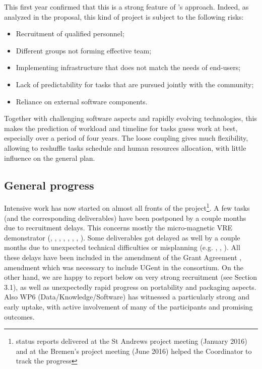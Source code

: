 \documentclass{deliverablereport}
\begin{document}
This first year confirmed that this is a strong feature of \ODK's
approach. Indeed, as analyzed in the proposal, this kind of project is
subject to the following risks:
\begin{itemize}
\item Recruitment of qualified personnel;
\item Different groups not forming effective team;
\item Implementing infrastructure that does not match the needs of end-users;
\item Lack of predictability for tasks that are pursued jointly with
  the community;
\item Reliance on external software components.
\end{itemize}
Together with challenging software aspects and rapidly evolving
technologies, this makes the prediction of workload and timeline for
tasks guess work at best, especially over a period of four years. The
loose coupling gives much flexibility, allowing to reshuffle tasks
schedule and human resources allocation, with little influence on the
general plan.

\subsection{General progress}

Intensive work has now started on almost all fronts of the project\footnote{status reports delivered at the St Andrews project meeting (January 2016) and at the Bremen's project meeting (June 2016) helped the Coordinator to track the progress}. A
few tasks (and the corresponding deliverables) have been postponed by
a couple months due to recruitment delays. This concerns mostly the
micro-magnetic VRE demonstrator (, ,
 , , , ,
 , ). Some deliverables got delayed as well
by a couple months due to unexpected technical difficulties or
misplanning (e.g. ,
, ). All these delays have been included in the amendment of the Grant Agreement
, amendment which was necessary to include UGent in the consortium. On
the other hand, we are happy to report below on very strong
recruitment (see Section 3.1), as well as unexpectedly rapid
progress on portability and packaging aspects. Also WP6
(Data/Knowledge/Software) has witnessed a particularly strong and
early uptake, with active involvement of many of the participants and
promising outcomes.
\end{document}
